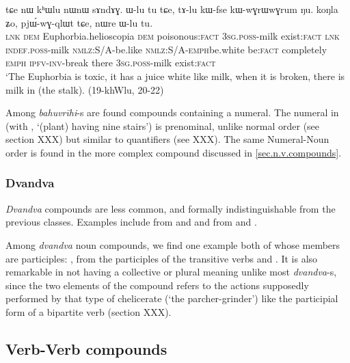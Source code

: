 \begin{exe}
\ex \label{ex:khWlu}  
\gll tɕe nɯ kʰɯlu nɯnɯ sɤndɤɣ. ɯ-lu tu tɕe, tɤ-lu kɯ-fse kɯ-wɣrɯ\redp{}wɣrum ŋu. koŋla ʑo, pjɯ́-wɣ-qlɯt tɕe, nɯre ɯ-lu tu. \\
\textsc{lnk} \textsc{dem} Euphorbia.helioscopia \textsc{dem} poisonous:\textsc{fact} \textsc{3sg.poss}-milk exist:\textsc{fact} \textsc{lnk}  \textsc{indef.poss}-milk \textsc{nmlz}:S/A-be.like \textsc{nmlz}:S/A-\textsc{emph}\redp{}be.white be:\textsc{fact} completely \textsc{emph} \textsc{ipfv}-\textsc{inv}-break there \textsc{3sg.poss}-milk exist:\textsc{fact} \\
\glt `The Euphorbia is toxic, it has a juice white like milk, when it is broken, there is milk in (the stalk). (19-khWlu, 20-22)
\end{exe}
Among \textit{bahuvrīhi}-s are found compounds containing a numeral. The numeral  in  (with , `(plant) having nine stairs') is prenominal, unlike normal order (see section XXX) but similar to quantifiers (see XXX). The same Numeral-Noun order is found in the more complex compound  discussed in \ref{sec.n.v.compounds}.

\subsubsection{Dvandva} \label{sec:dvandva.n.n}
\textit{Dvandva} compounds are less common, and formally indistinguishable from the previous classes. Examples include  from  and  and  from  and . 

Among \textit{dvandva} noun compounds, we find one example both of whose members are participles: , from the  participles of the transitive verbs  and  . It is also remarkable in not having a collective or plural meaning unlike most \textit{dvandva}-s, since the two elements of the compound refers to the actions supposedly performed by that type of chelicerate (`the parcher-grinder') like the participial form of a bipartite verb (section XXX).

\subsection{Verb-Verb compounds} \label{sec.v.v.compounds}

